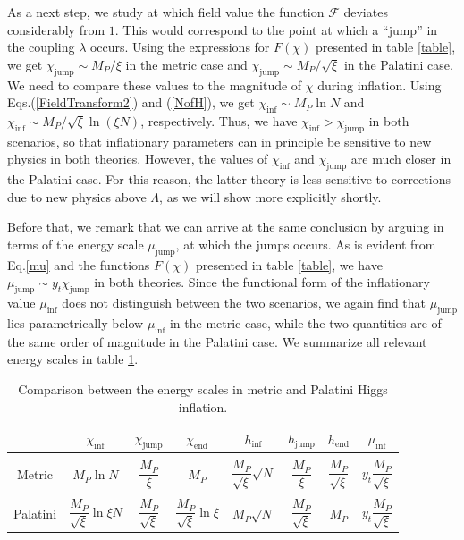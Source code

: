 \documentclass[a4paper,11pt]{article}
\makeatletter
\newcommand*{\Eq}{Eq.\@\xspace}
\newcommand*{\Eqs}{Eqs.\@\xspace}
\makeatother
\begin{document}
As a next step, we study at which field value the function $\mathcal{F}$ deviates considerably from $1$. This would correspond to the point at which a ``jump'' in the coupling $\lambda$ occurs. Using the expressions for $F(\chi)$ presented in table \ref{table}, we get $\chi_{\text{jump}}\sim M_P/\xi$ in the metric case and $\chi_{\text{jump}}\sim M_P/\sqrt{\xi}$ in the Palatini case. We need to compare these values to the magnitude of $\chi$ during inflation. Using \Eqs (\ref{FieldTransform2}) and (\ref{NofH}), we get $\chi_{\text{inf}}\sim M_P \ln N$ and $\chi_{\text{inf}}\sim M_P / \sqrt{\xi} \ln (\xi N)$, respectively. Thus, we have $\chi_{\text{inf}}> \chi_{\text{jump}}$ in both scenarios, so that inflationary parameters can in principle be sensitive to new physics in both theories. However, the values of $\chi_{\text{inf}}$ and $\chi_{\text{jump}}$ are much closer in the Palatini case. For this reason, the latter theory is less sensitive to corrections due to new physics above $\Lambda$, as we will show more explicitly shortly.
	
Before that, we remark that we can arrive at the same conclusion by arguing in terms of the energy scale $\mu_{\text{jump}}$, at which the jumps occurs. As is evident from \Eq \eqref{mu} and the functions $F(\chi)$ presented in table \ref{table}, we have $\mu_{\text{jump}} \sim y_t \chi_{\text{jump}}$ in both theories. Since the functional form of the inflationary value $\mu_{\text{inf}}$ does not distinguish between the two scenarios, we again find that $\mu_{\text{jump}}$ lies parametrically below $\mu_{\text{inf}}$ in the metric case, while the two quantities are of the same order of magnitude in the Palatini case. We summarize all relevant energy scales in table \ref{table2}.

	\begin{table}
	\begin{center}
		\begin{tabular}{c|ccccccc}
		& 	$\chi_{\text{inf}}$  & 	$\chi_{\text{jump}}$& 	$\chi_{\text{end}}$& 	$h_{\text{inf}}$& $h_{\text{jump}}$&	$h_{\text{end}}$&	$\mu_{\text{inf}}$ \\[8pt]
	\hline 	\\[-5pt]
		 Metric & $M_P\ln N$  & 	$\dfrac{M_P}{\xi}$  & $M_P$& $\dfrac{M_P}{\sqrt{\xi}} \sqrt{N}$ & 	$\dfrac{M_P}{\xi}$  &$\dfrac{M_P}{\sqrt{\xi}}$&  $y_t \dfrac{M_P}{\sqrt{\xi}}$ \\	\\
		 	Palatini 	& $\dfrac{M_P}{\sqrt{\xi}}\ln\xi N$  &  $\dfrac{M_P}{\sqrt{\xi}}$&$\dfrac{M_P}{\sqrt{\xi}}\ln\xi$& $M_P \sqrt{N}$&$\dfrac{M_P}{\sqrt{\xi}}$& $M_P$&  $y_t \dfrac{M_P}{\sqrt{\xi}}$
		\end{tabular}
		\caption{Comparison between the energy scales in metric and Palatini Higgs inflation.}
		\label{table2}
		\end{center}
	\end{table}
\end{document}
